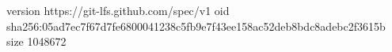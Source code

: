 version https://git-lfs.github.com/spec/v1
oid sha256:05ad7ec7f67d7fe6800041238c5fb9e7f43ee158ac52deb8bdc8adebc2f3615b
size 1048672
